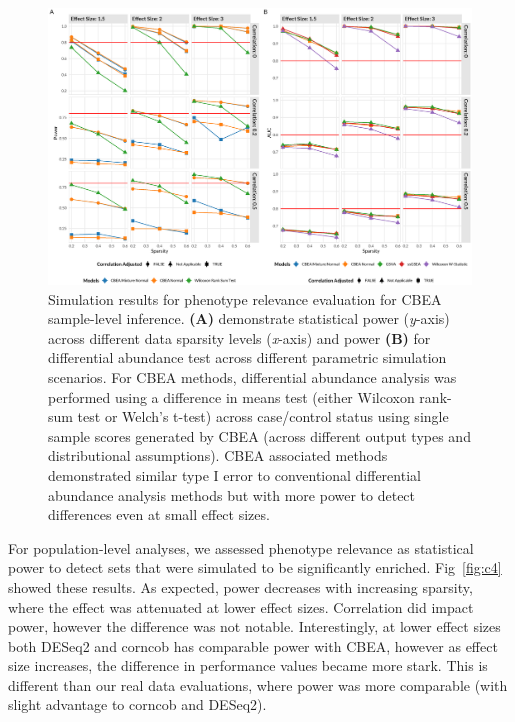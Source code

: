 \begin{figure}[!h]
    \centering
    \includegraphics[width=\linewidth]{figures/appC_fs3.eps}
    \caption[Simulation results for phenotype relevance evaluation for CBEA sample-level inference]{Simulation results for phenotype relevance evaluation for CBEA sample-level inference. \textbf{(A)} demonstrate statistical power (\emph{y}-axis) across different data sparsity levels (\emph{x}-axis) and power \textbf{(B)} for differential abundance test across different parametric simulation scenarios. For CBEA methods, differential abundance analysis was performed using a difference in means test (either Wilcoxon rank-sum test or Welch's t-test) across case/control status using single sample scores generated by CBEA (across different output types and distributional assumptions). CBEA associated methods demonstrated similar type I error to conventional differential abundance analysis methods but with more power to detect differences even at small effect sizes.}
    \label{fig:c3}
\end{figure}

For population-level analyses, we assessed phenotype relevance as statistical power to detect sets that were simulated to be significantly enriched. Fig~\ref{fig:c4} showed these results. As expected, power decreases with increasing sparsity, where the effect was attenuated at lower effect sizes. Correlation did impact power, however the difference was not notable. Interestingly, at lower effect sizes both DESeq2 and corncob has comparable power with CBEA, however as effect size increases, the difference in performance values became more stark. This is different than our real data evaluations, where power was more comparable (with slight advantage to corncob and DESeq2). 

